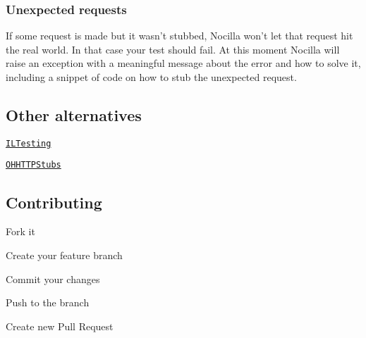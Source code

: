\subsubsection*{Unexpected requests}

If some request is made but it wasn't stubbed, Nocilla won't let that request hit the real world. In that case your test should fail. At this moment Nocilla will raise an exception with a meaningful message about the error and how to solve it, including a snippet of code on how to stub the unexpected request.

\subsection*{Other alternatives}


\begin{DoxyItemize}
\item \href{https://github.com/InfiniteLoopDK/ILTesting}{\tt I\-L\-Testing}
\item \href{https://github.com/AliSoftware/OHHTTPStubs}{\tt O\-H\-H\-T\-T\-P\-Stubs}
\end{DoxyItemize}

\subsection*{Contributing}


\begin{DoxyEnumerate}
\item Fork it
\item Create your feature branch
\item Commit your changes
\item Push to the branch
\item Create new Pull Request 
\end{DoxyEnumerate}